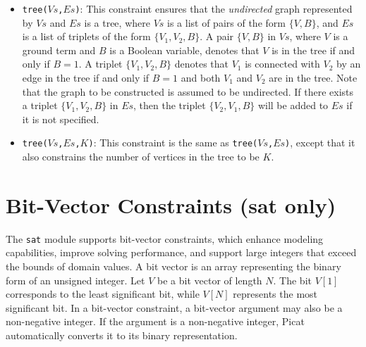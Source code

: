\begin{itemize}
\item \texttt{tree($Vs$,$Es$)}: This constraint ensures that the \textit{undirected} graph represented by $Vs$ and $Es$ is a tree, where $Vs$ is a list of pairs of the form $\{V,B\}$, and $Es$ is a list of triplets of the form $\{V_1,V_2,B\}$. A pair $\{V,B\}$ in $Vs$, where $V$ is a ground term and $B$ is a Boolean variable, denotes that $V$ is in the tree if and only if $B = 1$. A triplet $\{V_1,V_2,B\}$ denotes that $V_1$ is connected with $V_2$  by an edge in the tree if and only if $B = 1$ and both $V_1$ and $V_2$ are in the tree. Note that the graph to be constructed is assumed to be undirected. If there exists a triplet $\{V_1,V_2,B\}$ in $Es$, then the triplet $\{V_2,V_1,B\}$ will be added to $Es$ if it is not specified.

\item \texttt{tree($Vs$,$Es$,$K$)}:  This constraint is the same as \texttt{tree($Vs$,$Es$)}, except that it also constrains the number of vertices in the tree to be $K$. 
\end{itemize}

\section{Bit-Vector Constraints (sat only)}
The \texttt{sat} module supports bit-vector constraints, which enhance modeling capabilities, improve solving performance, and support large integers that exceed the bounds of domain values. A bit vector is an array representing the binary form of an unsigned integer. Let $V$ be a bit vector of length $N$. The bit $V[1]$ corresponds to the least significant bit, while $V[N]$ represents the most significant bit. In a bit-vector constraint, a bit-vector argument may also be a non-negative integer. If the argument is a non-negative integer, Picat automatically converts it to its binary representation. 

